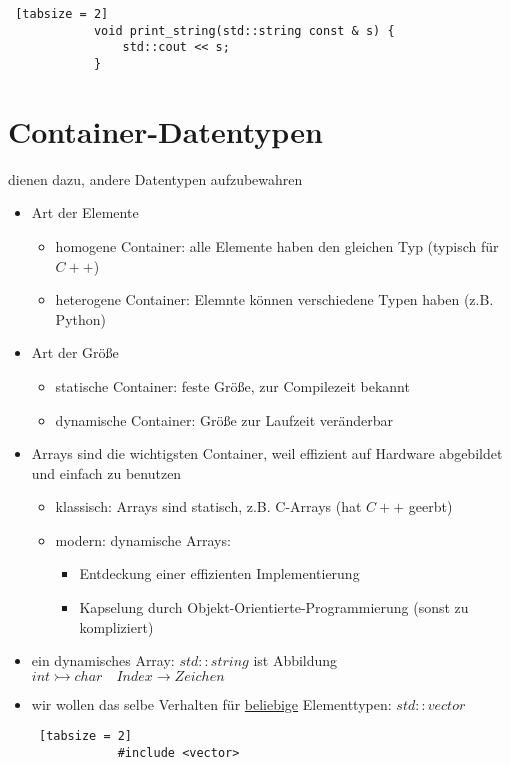\documentclass{article}
\begin{document}
\begin{itemize}
	 	\begin{lstlisting} [tabsize = 2]
	 		void print_string(std::string const & s) {
		 		std::cout << s;
	 		}
	 	\end{lstlisting}
	 \end{itemize}
	 
	 \section{Container-Datentypen}
	 dienen dazu, andere Datentypen aufzubewahren
	 \begin{itemize}
	 	\item Art der Elemente
	 	\begin{itemize}
		 	\item homogene Container: alle Elemente haben den gleichen Typ (typisch für $C++$)
		 	\item heterogene Container: Elemnte können verschiedene Typen haben (z.B. Python)
	 	\end{itemize}
	 	\item Art der Größe
	 	\begin{itemize}
	 		\item statische Container: feste Größe, zur Compilezeit bekannt
	 		\item dynamische Container: Größe zur Laufzeit veränderbar
	 	\end{itemize}
	 	\item Arrays sind die wichtigsten Container, weil effizient auf Hardware abgebildet und einfach zu benutzen
	 	\begin{itemize}
	 		\item klassisch: Arrays sind statisch, z.B. C-Arrays (hat $C++$ geerbt)
	 		\item modern: dynamische Arrays:
	 		\begin{itemize}
	 			\item Entdeckung einer effizienten Implementierung
	 			\item Kapselung durch Objekt-Orientierte-Programmierung (sonst zu kompliziert)
	 		\end{itemize}
	 	\end{itemize}
	 	\item ein dynamisches Array: $std::string$ ist Abbildung $int \rightarrowtail char \quad Index \rightarrow Zeichen$
	 	\item wir wollen das selbe Verhalten für \underline{beliebige} Elementtypen: $std::vector$
	 	\begin{lstlisting} [tabsize = 2]
	 		#include <vector>
	 		

\end{lstlisting}
\end{itemize}
\end{document}
